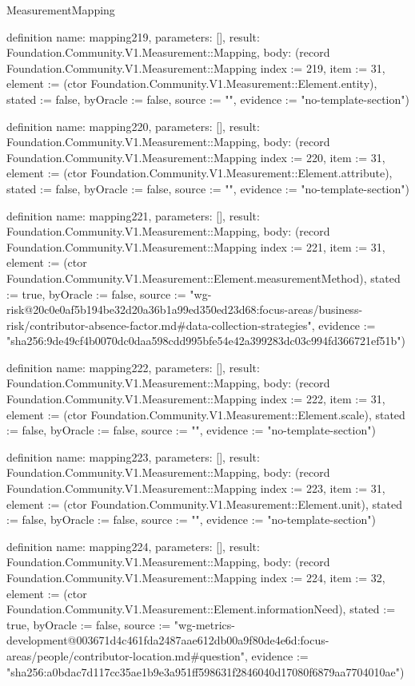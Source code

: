 \begin{lexlean}{MeasurementMapping}
\begin{semanticmodule}
definition{
  name: mapping219,
  parameters: [],
  result: Foundation.Community.V1.Measurement::Mapping,
  body: (record Foundation.Community.V1.Measurement::Mapping {index := 219, item := 31, element := (ctor Foundation.Community.V1.Measurement::Element.entity), stated := false, byOracle := false, source := "", evidence := "no-template-section"})
}

definition{
  name: mapping220,
  parameters: [],
  result: Foundation.Community.V1.Measurement::Mapping,
  body: (record Foundation.Community.V1.Measurement::Mapping {index := 220, item := 31, element := (ctor Foundation.Community.V1.Measurement::Element.attribute), stated := false, byOracle := false, source := "", evidence := "no-template-section"})
}

definition{
  name: mapping221,
  parameters: [],
  result: Foundation.Community.V1.Measurement::Mapping,
  body: (record Foundation.Community.V1.Measurement::Mapping {index := 221, item := 31, element := (ctor Foundation.Community.V1.Measurement::Element.measurementMethod), stated := true, byOracle := false, source := "wg-risk@20c0e0af5b194be32d20a36b1a99ed350ed23d68:focus-areas/business-risk/contributor-absence-factor.md#data-collection-strategies", evidence := "sha256:9de49cf4b0070dc0daa598cdd995bfe54e42a399283dc03c994fd366721ef51b"})
}

definition{
  name: mapping222,
  parameters: [],
  result: Foundation.Community.V1.Measurement::Mapping,
  body: (record Foundation.Community.V1.Measurement::Mapping {index := 222, item := 31, element := (ctor Foundation.Community.V1.Measurement::Element.scale), stated := false, byOracle := false, source := "", evidence := "no-template-section"})
}

definition{
  name: mapping223,
  parameters: [],
  result: Foundation.Community.V1.Measurement::Mapping,
  body: (record Foundation.Community.V1.Measurement::Mapping {index := 223, item := 31, element := (ctor Foundation.Community.V1.Measurement::Element.unit), stated := false, byOracle := false, source := "", evidence := "no-template-section"})
}

definition{
  name: mapping224,
  parameters: [],
  result: Foundation.Community.V1.Measurement::Mapping,
  body: (record Foundation.Community.V1.Measurement::Mapping {index := 224, item := 32, element := (ctor Foundation.Community.V1.Measurement::Element.informationNeed), stated := true, byOracle := false, source := "wg-metrics-development@003671d4c461fda2487aae612db00a9f80de4e6d:focus-areas/people/contributor-location.md#question", evidence := "sha256:a0bdac7d117cc35ae1b9e3a951ff598631f2846040d17080f6879aa7704010ae"})
}


\end{semanticmodule}
\end{lexlean}
